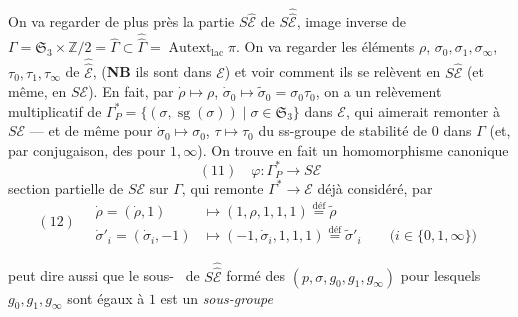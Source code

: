 \documentclass[11pt,a4paper]{article}
\begin{document}

On va regarder de plus près la partie $S\hat{\mathcal{E}}$ de
$S\hat{\hat{\mathcal{E}}}$, image inverse de $\Gamma = \mathfrak{S}_3 \times
\mathbb{Z}/2 = \hat\Gamma \subset \hat{\hat\Gamma} =
\operatorname{Autext}_{\mathrm{lac}}\hat\pi$.
On va regarder les éléments \struck{\ill{}} $\rho$, $\sigma_0, \sigma_1,
\sigma_\infty$, $\tau_0, \tau_1, \tau_\infty$ de $\hat{\hat{\mathcal{E}}}$,
 (\textbf{NB} ils sont  dans
$\mathcal{E}$) et voir comment ils se relèvent en $S\hat{\mathcal{E}}$ (et même, en
$S\mathcal{E}$). En fait, par $\dot\rho \mapsto \rho$, $\dot\sigma_0 \mapsto
\tilde\sigma_0 = \sigma_0\tau_0$, on a un relèvement multiplicatif de
$\Gamma^{*}_{P} = \{(\sigma, \operatorname{sg}(\sigma)) \mid \sigma \in
\mathfrak{S}_3\}$ dans $\mathcal{E}$, qui aimerait remonter à $S\mathcal{E}$ --- et de
même pour $\dot\sigma_0 \mapsto \sigma_0$, $\tau \mapsto \tau_0$ du
ss-groupe de stabilité de $0$ dans $\Gamma$ (et, par conjugaison, des pour
$1, \infty$). On trouve en fait un homomorphisme canonique
\[
(11)\quad \varphi : \Gamma^{*}_{P} \longrightarrow S\mathcal{E}
\]
 section partielle de $S\mathcal{E}$ sur $\Gamma$, qui remonte
$\Gamma^{*} \to \mathcal{E}$ déjà considéré, par
\[
(12)\quad
\begin{aligned}
\dot\rho = (\dot\rho, 1) &\longmapsto (1, \rho, 1, 1, 1)
\overset{\text{déf}}{=} \tilde\rho\\
\dot\sigma'_i = (\dot\sigma_i, -1) &\longmapsto (-1, \dot\sigma_i, 1, 1, 1)
\overset{\text{déf}}{=} \tilde\sigma'_i \qquad \bigl(i \in \{0, 1,
\infty\}\bigr)
\end{aligned}
\]

 peut dire aussi que le sous- \ de
$S\hat{\hat{\mathcal{E}}}$ formé des $(p, \sigma, g_0, g_1, g_\infty)$ pour lesquels
$g_0, g_1, g_\infty$ sont égaux à $1$ est un \emph{sous-groupe}

\end{document}
